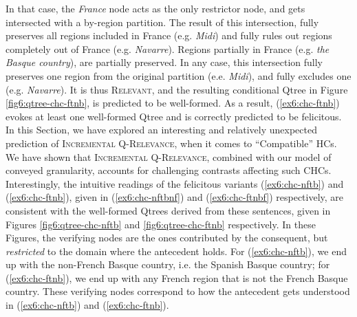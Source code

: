 In that case, the \textit{France} node acts as the only restrictor node, and gets intersected with a by-region partition. The result of this intersection, fully preserves all regions included in France (e.g. \textit{Midi}) and fully rules out regions completely out of France (e.g. \textit{Navarre}). Regions partially in France (e.g. \textit{the Basque country}), are partially preserved. In any case, this intersection fully preserves one region from the original partition (e.e. \textit{Midi}), and fully excludes one (e.g. \textit{Navarre}). It is thus \textsc{Relevant}, and the resulting conditional Qtree in Figure \ref{fig6:qtree-chc-ftnb}, is predicted to be well-formed. As a result, (\ref{ex6:chc-ftnb}) evokes at least one well-formed Qtree and is correctly predicted to be felicitous.\\

In this Section, we have explored an interesting and relatively unexpected prediction of \textsc{Incremental Q-Relevance}, when it comes to ``Compatible'' HCs. We have shown that \textsc{Incremental Q-Relevance}, combined with our model of conveyed granularity, accounts for challenging contrasts affecting such CHCs. Interestingly, the intuitive readings of the felicitous variants   (\ref{ex6:chc-nftb}) and (\ref{ex6:chc-ftnb}), given in (\ref{ex6:chc-nftbnf}) and (\ref{ex6:chc-ftnbf}) respectively, are consistent with the well-formed Qtrees derived from these sentences, given in Figures \ref{fig6:qtree-chc-nftb} and \ref{fig6:qtree-chc-ftnb} respectively. In these Figures, the verifying nodes are the ones contributed by the consequent, but \textit{restricted} to the domain where the antecedent holds. For (\ref{ex6:chc-nftb}), we end up with the non-French Basque country, i.e. the Spanish Basque country; for (\ref{ex6:chc-ftnb}), we end up with any French region that is not the French Basque country. These verifying nodes correspond to how the antecedent gets understood in (\ref{ex6:chc-nftb}) and (\ref{ex6:chc-ftnb}).

